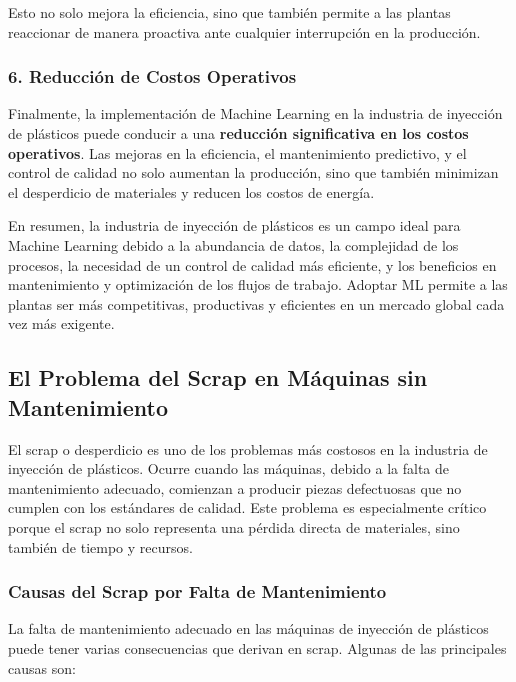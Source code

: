Esto no solo mejora la eficiencia, sino que también permite a las plantas reaccionar de manera proactiva ante cualquier interrupción en la producción.

\subsubsection{6. Reducción de Costos Operativos}

Finalmente, la implementación de Machine Learning en la industria de inyección de plásticos puede conducir a una \textbf{reducción significativa en los costos operativos}. Las mejoras en la eficiencia, el mantenimiento predictivo, y el control de calidad no solo aumentan la producción, sino que también minimizan el desperdicio de materiales y reducen los costos de energía.

En resumen, la industria de inyección de plásticos es un campo ideal para Machine Learning debido a la abundancia de datos, la complejidad de los procesos, la necesidad de un control de calidad más eficiente, y los beneficios en mantenimiento y optimización de los flujos de trabajo. Adoptar ML permite a las plantas ser más competitivas, productivas y eficientes en un mercado global cada vez más exigente.


\subsection{El Problema del Scrap en Máquinas sin Mantenimiento}

El scrap o desperdicio es uno de los problemas más costosos en la industria de inyección de plásticos. Ocurre cuando las máquinas, debido a la falta de mantenimiento adecuado, comienzan a producir piezas defectuosas que no cumplen con los estándares de calidad. Este problema es especialmente crítico porque el scrap no solo representa una pérdida directa de materiales, sino también de tiempo y recursos.

\subsubsection{Causas del Scrap por Falta de Mantenimiento}

La falta de mantenimiento adecuado en las máquinas de inyección de plásticos puede tener varias consecuencias que derivan en scrap. Algunas de las principales causas son:

